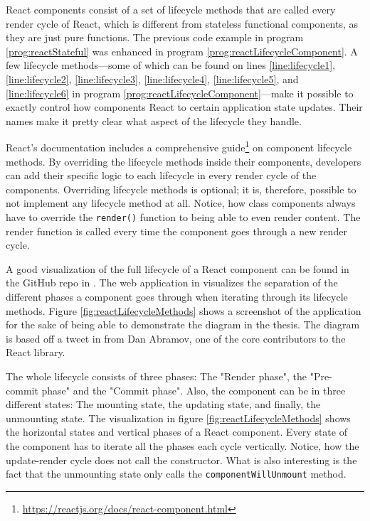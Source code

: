 React components consist of a set of lifecycle methods that are called every render cycle of React, which is different from stateless functional components, as they are just pure functions. The previous code example in program \ref{prog:reactStateful} was enhanced in program \ref{prog:reactLifecycleComponent}. A few lifecycle methods---some of which can be found on lines \ref{line:lifecycle1}, \ref{line:lifecycle2}, \ref{line:lifecycle3}, \ref{line:lifecycle4}, \ref{line:lifecycle5}, and \ref{line:lifecycle6} in program \ref{prog:reactLifecycleComponent}---make it possible to exactly control how components React to certain application state updates. Their names make it pretty clear what aspect of the lifecycle they handle.

React's documentation includes a comprehensive guide\footnote{\url{https://reactjs.org/docs/react-component.html}} on component lifecycle methods. By overriding the lifecycle methods inside their components, developers can add their specific logic to each lifecycle in every render cycle of the components. Overriding lifecycle methods is optional; it is, therefore, possible to not implement any lifecycle method at all. Notice, how class components always have to override the \texttt{render()} function to being able to even render content. The render function is called every time the component goes through a new render cycle.

A good visualization of the full lifecycle of a React component can be found in the GitHub repo in \cite{ReactRenderCycleGithub}. The web application in \cite{ReactRenderCycleDiagram} visualizes the separation of the different phases a component goes through when iterating through its lifecycle methods. Figure \ref{fig:reactLifecycleMethods} shows a screenshot of the application for the sake of being able to demonstrate the diagram in the thesis. The diagram is based off a tweet in \cite{ReactCycleTweet} from Dan Abramov, one of the core contributors to the React library.

The whole lifecycle consists of three phases: The "Render phase", the "Pre-commit phase" and the "Commit phase". Also, the component can be in three different states: The mounting state, the updating state, and finally, the unmounting state. The visualization in figure \ref{fig:reactLifecycleMethods} shows the horizontal states and vertical phases of a React component. Every state of the component has to iterate all the phases each cycle vertically. Notice, how the update-render cycle does not call the constructor. What is also interesting is the fact that the unmounting state only calls the \texttt{componentWillUnmount} method.

